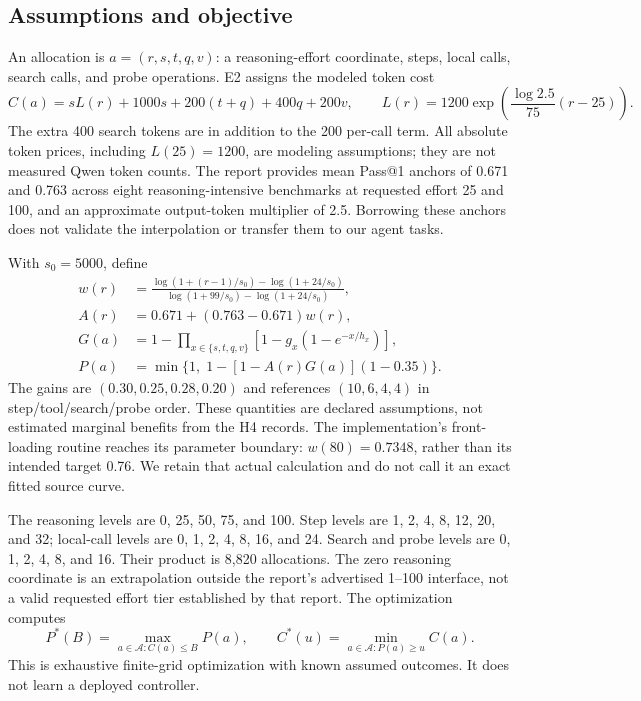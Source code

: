 \documentclass[11pt]{article}
\begin{document}
\subsection{Assumptions and objective}
An allocation is $a=(r,s,t,q,v)$: a reasoning-effort coordinate, steps, local calls, search calls, and probe operations. E2 assigns the modeled token cost
\begin{equation}
 C(a)=sL(r)+1000s+200(t+q)+400q+200v,
 \qquad L(r)=1200\exp\!\left(\frac{\log 2.5}{75}(r-25)\right).
\label{eq:cost}
\end{equation}
The extra 400 search tokens are in addition to the 200 per-call term. All absolute token prices, including $L(25)=1200$, are modeling assumptions; they are not measured Qwen token counts. The report provides mean Pass@1 anchors of 0.671 and 0.763 across eight reasoning-intensive benchmarks at requested effort 25 and 100, and an approximate output-token multiplier of 2.5. Borrowing these anchors does not validate the interpolation or transfer them to our agent tasks.

With $s_0=5000$, define
\begin{align}
 w(r)&=\frac{\log(1+(r-1)/s_0)-\log(1+24/s_0)}
 {\log(1+99/s_0)-\log(1+24/s_0)}, \\
 A(r)&=0.671+(0.763-0.671)w(r), \\
 G(a)&=1-\prod_{x\in\{s,t,q,v\}}[1-g_x(1-e^{-x/h_x})], \\
 P(a)&=\min\{1,\;1-[1-A(r)G(a)](1-0.35)\}.
\label{eq:success}
\end{align}
The gains are $(0.30,0.25,0.28,0.20)$ and references $(10,6,4,4)$ in step/tool/search/probe order. These quantities are declared assumptions, not estimated marginal benefits from the H4 records. The implementation's front-loading routine reaches its parameter boundary: $w(80)=0.7348$, rather than its intended target 0.76. We retain that actual calculation and do not call it an exact fitted source curve.

The reasoning levels are 0, 25, 50, 75, and 100. Step levels are 1, 2, 4, 8, 12, 20, and 32; local-call levels are 0, 1, 2, 4, 8, 16, and 24. Search and probe levels are 0, 1, 2, 4, 8, and 16. Their product is 8,820 allocations. The zero reasoning coordinate is an extrapolation outside the report's advertised 1--100 interface, not a valid requested effort tier established by that report. The optimization computes
\begin{equation}
 P^*(B)=\max_{a\in\mathcal A:C(a)\le B}P(a),\qquad
 C^*(u)=\min_{a\in\mathcal A:P(a)\ge u}C(a).
\end{equation}
This is exhaustive finite-grid optimization with known assumed outcomes. It does not learn a deployed controller.
\end{document}
